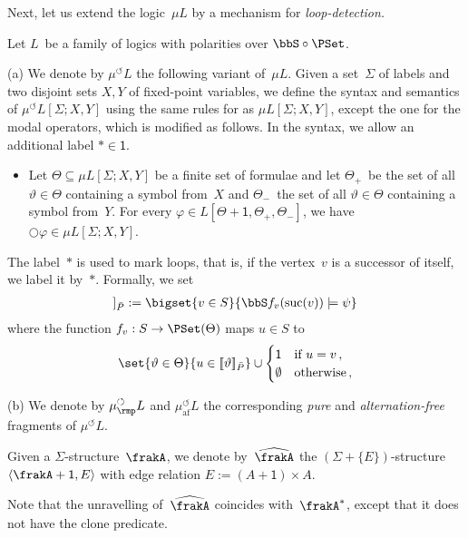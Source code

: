 \documentclass[10pt, fleqn]{scrartcl}
\newcommand*{\suc}{\mathrm{suc}}
\newcommand*{\muaf}{\mu_{\mathrm{af}}}
\newcommand*{\mup}{\mu_\rmp}
\newcommand*{\one}{\textsf{1}}
\newcommand*{\?}{\kern .08em}
\newcommand\medcircle{\bigcirc}
\newcommand\lsem{[\![}
\newcommand\rsem{]\!]}
\newcommand\rcirclearrowleft{\circlearrowleft}
\begin{document}
Next, let us extend the logic~$\mu L$ by a mechanism for \emph{loop-detection.}
\begin{Def}
Let $L$~be a family of logics with polarities over $\bbS \circ \PSet$.

(a) We denote by $\mu^\rcirclearrowleft L$ the following variant of~$\mu L$.
Given a set~$\Sigma$ of labels and two disjoint sets $X,Y$ of fixed-point variables,
we define the syntax and semantics of $\mu^\rcirclearrowleft L[\Sigma;X,Y]$ using the same
rules for as $\mu L[\Sigma;X,Y]$, except the one for the modal operators, which is modified
as follows. In the syntax, we allow an additional label ${*} \in \one$.
\begin{itemize}
\item Let $\Theta \subseteq \mu L[\Sigma;X,Y]$ be a finite set of formulae
  and let $\Theta_+$~be the set of all $\vartheta \in \Theta$ containing a symbol from~$X$ and
  $\Theta_-$~the set of all $\vartheta \in \Theta$ containing a symbol from~$Y$.
  For every $\varphi \in L[\Theta+\one,\Theta_+,\Theta_-]$, we have
  ${\medcircle}\varphi \in \mu L[\Sigma;X,Y]$.
\end{itemize}
The label~$*$ is used to mark loops, that is, if the vertex~$v$ is a successor of itself,
we label it by~$*$. Formally, we set
\begin{align*}
  \lsem{\medcircle}\psi\rsem_{\bar P} :=
    \bigset{ v \in S }{ \bbS f_v(\suc(v)) \models \psi }
\end{align*}
where the function $f_v : S \to \PSet(\Theta)$ maps $u \in S$ to
\begin{align*}
  \set{ \vartheta \in \Theta }{ u \in \lsem\vartheta\rsem_{\bar P} }
  \cup
  \begin{cases}
    \one      &\text{if } u = v\,, \\
    \emptyset &\text{otherwise}\,,
  \end{cases}
\end{align*}

(b) We denote by $\mup^\rcirclearrowleft L$ and $\muaf^\rcirclearrowleft L$ the
corresponding \emph{pure} and \emph{alternation-free} fragments of $\mu^\rcirclearrowleft L$.
\end{Def}

\begin{Def}
Given a $\Sigma$-structure~$\frakA$, we denote by~$\widehat\frakA$ the
$(\Sigma + \{E\})$-structure $\langle\frakA + \one,E\rangle$ with edge
relation $E := (A + \one) \times A$.
\end{Def}
Note that the unravelling of~$\widehat\frakA$ coincides with~$\frakA^*$,
except that it does not have the clone predicate.
\end{document}
